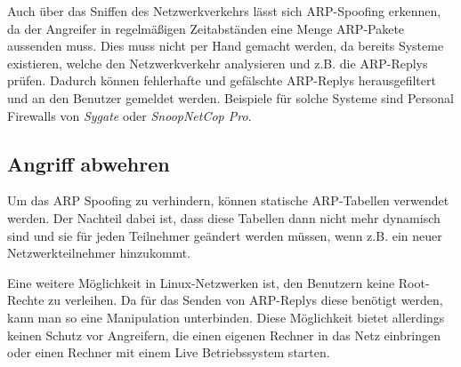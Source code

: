 Auch über das Sniffen des Netzwerkverkehrs lässt sich ARP-Spoofing erkennen, da der Angreifer in regelmäßigen Zeitabständen eine Menge ARP-Pakete aussenden muss. Dies muss nicht per Hand gemacht werden, da bereits Systeme existieren, welche den Netzwerkverkehr analysieren und z.B. die ARP-Replys prüfen. Dadurch können fehlerhafte und gefälschte ARP-Replys herausgefiltert und an den Benutzer gemeldet werden. Beispiele für solche Systeme sind Personal Firewalls von \emph{Sygate} oder \emph{SnoopNetCop Pro}.

\subsection{Angriff abwehren}
Um das ARP Spoofing zu verhindern, können statische ARP-Tabellen verwendet werden. Der Nachteil dabei ist, dass diese Tabellen dann nicht mehr dynamisch sind und sie für jeden Teilnehmer geändert werden müssen, wenn z.B. ein neuer Netzwerkteilnehmer hinzukommt.

Eine weitere Möglichkeit in Linux-Netzwerken ist, den Benutzern keine Root-Rechte zu verleihen. Da für das Senden von ARP-Replys diese benötigt werden, kann man so eine Manipulation unterbinden. Diese Möglichkeit bietet allerdings keinen Schutz vor Angreifern, die einen eigenen Rechner in das Netz einbringen oder einen Rechner mit einem Live Betriebssystem starten.
